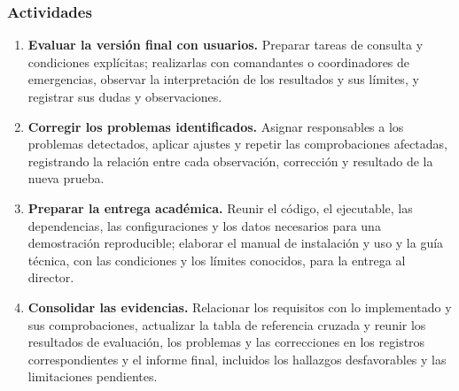 \subsubsection{Actividades}\label{sec:transicion-actividades}

\begin{enumerate}
    \item \textbf{Evaluar la versión final con usuarios.}
    Preparar tareas de consulta y condiciones explícitas;
    realizarlas con comandantes o coordinadores de emergencias,
    observar la interpretación de los resultados y sus límites,
    y registrar sus dudas y observaciones.

    \item \textbf{Corregir los problemas identificados.}
    Asignar responsables a los problemas detectados, aplicar
    ajustes y repetir las comprobaciones afectadas, registrando
    la relación entre cada observación, corrección y resultado
    de la nueva prueba.

    \item \textbf{Preparar la entrega académica.}
    Reunir el código, el ejecutable, las dependencias, las
    configuraciones y los datos necesarios para una demostración
    reproducible; elaborar el manual de instalación y uso y la
    guía técnica, con las condiciones y los límites conocidos,
    para la entrega al director.

    \item \textbf{Consolidar las evidencias.}
    Relacionar los requisitos con lo implementado y sus
    comprobaciones, actualizar la tabla de referencia cruzada
    y reunir los resultados de evaluación, los problemas y las
    correcciones en los registros correspondientes y el informe
    final, incluidos los hallazgos desfavorables y las
    limitaciones pendientes.
\end{enumerate}